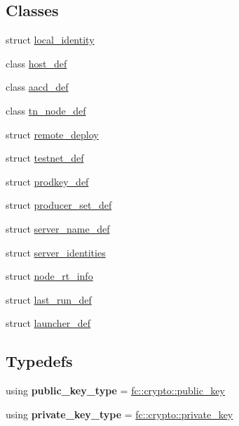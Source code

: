 \subsection*{Classes}
\begin{DoxyCompactItemize}
\item 
struct \mbox{\hyperlink{structlocal__identity}{local\+\_\+identity}}
\item 
class \mbox{\hyperlink{classhost__def}{host\+\_\+def}}
\item 
class \mbox{\hyperlink{classaacd__def}{aacd\+\_\+def}}
\item 
class \mbox{\hyperlink{classtn__node__def}{tn\+\_\+node\+\_\+def}}
\item 
struct \mbox{\hyperlink{structremote__deploy}{remote\+\_\+deploy}}
\item 
struct \mbox{\hyperlink{structtestnet__def}{testnet\+\_\+def}}
\item 
struct \mbox{\hyperlink{structprodkey__def}{prodkey\+\_\+def}}
\item 
struct \mbox{\hyperlink{structproducer__set__def}{producer\+\_\+set\+\_\+def}}
\item 
struct \mbox{\hyperlink{structserver__name__def}{server\+\_\+name\+\_\+def}}
\item 
struct \mbox{\hyperlink{structserver__identities}{server\+\_\+identities}}
\item 
struct \mbox{\hyperlink{structnode__rt__info}{node\+\_\+rt\+\_\+info}}
\item 
struct \mbox{\hyperlink{structlast__run__def}{last\+\_\+run\+\_\+def}}
\item 
struct \mbox{\hyperlink{structlauncher__def}{launcher\+\_\+def}}
\end{DoxyCompactItemize}
\subsection*{Typedefs}
\begin{DoxyCompactItemize}
\item 
\mbox{\label{programs_2aacio-launcher_2main_8cpp_a4309c3a6418e39931154cbfbe22318e3}} 
using {\bfseries public\+\_\+key\+\_\+type} = \mbox{\hyperlink{classfc_1_1crypto_1_1public__key}{fc\+::crypto\+::public\+\_\+key}}
\item 
\mbox{\label{programs_2aacio-launcher_2main_8cpp_a4ccd0cf4c7952009cdf845ab8259b0a2}} 
using {\bfseries private\+\_\+key\+\_\+type} = \mbox{\hyperlink{classfc_1_1crypto_1_1private__key}{fc\+::crypto\+::private\+\_\+key}}
\end{DoxyCompactItemize}
